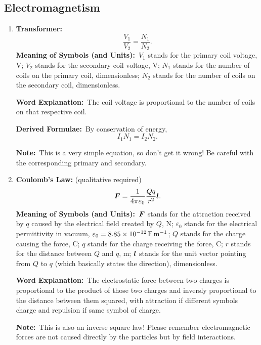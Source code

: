 \documentclass[8pt]{article}
\newcommand{\MeanSymb}{\textbf{Meaning of Symbols (and Units):}\ }
\newcommand{\WordExpl}{\textbf{Word Explanation:}\ }
\newcommand{\DeriForm}{\textbf{Derived Formulae:}\ }
\newcommand{\Note}{\textbf{Note:}\ }
\begin{document}
        \subsection{Electromagnetism}
            \begin{enumerate}
                \item \textbf{Transformer:}
                \[
                    \frac{V_1}{V_2} = \frac{N_1}{N_2}.
                \]
                \MeanSymb \(V_1\) stands for the primary coil voltage, \unit{\volt}; \(V_2\) stands for the secondary coil voltage, \unit{\volt}; \(N_1\) stands for the number of coils on the primary coil, dimensionless; \(N_2\) stands for the number of coils on the secondary coil, dimensionless.

                \WordExpl The coil voltage is proportional to the number of coils on that respective coil.

                \DeriForm By conservation of energy,
                \[
                    I_1 N_1 = I_2 N_2.
                \]

                \Note This is a very simple equation, so don't get it wrong! Be careful with the corresponding primary and secondary.

                \item \textbf{Coulomb's Law:} (qualitative required)
                \[
                    \boldsymbol{F} = \frac{1}{4 \pi \varepsilon_0} \frac{Q q}{r^2} \boldsymbol{l}.
                \]
                \MeanSymb \(\boldsymbol{F}\) stands for the attraction received by \(q\) caused by the electrical field created by \(Q\), \unit{\newton}; \(\varepsilon_0\) stands for the electrical permittivity in vacuum, \(\varepsilon_0 = \qty{8.85 e -12}{\farad \per \metre}\); \(Q\) stands for the charge causing the force, \unit{\coulomb}; \(q\) stands for the charge receiving the force, \unit{\coulomb}; \(r\) stands for the distance between \(Q\) and \(q\), \unit{\metre}; \(\boldsymbol{l}\) stands for the unit vector pointing from \(Q\) to \(q\) (which basically states the direction), dimensionless.

                \WordExpl The electrostatic force between two charges is proportional to the product of those two charges and inversly proportional to the distance between them squared, with attraction if different symbols charge and repulsion if same symbol of charge.

                \Note This is also an inverse square law! Please remember electromagnetic forces are not caused directly by the particles but by field interactions.


\end{enumerate}
\end{document}
